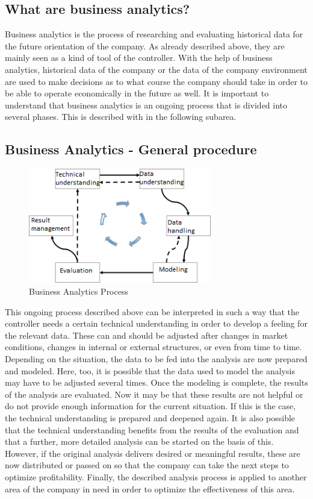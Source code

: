 \documentclass[12pt,twocolumn,twoside]{conference}   %
\begin{document}
\subsection{What are business analytics?}
Business analytics is the process of researching and evaluating historical data for the future orientation of the company.  As already described above, they are mainly seen as a kind of tool of the controller. With the help of business analytics, historical data of the company or the data of the company environment are used to make decisions as to what course the company should take in order to be able to operate economically in the future as well. It is important to understand that business analytics is an ongoing process that is divided into several phases. This is described with in the following subarea.


\subsection{Business Analytics - General procedure}

\begin{figure}[H]
\centering
\includegraphics[width=8cm]{Abbildungen/Business_Analytics_Process.png}
\caption{Business Analytics Process}\label{visina8}
\end{figure}

This ongoing process described above can be interpreted in such a way that the controller needs a certain technical understanding in order to develop a feeling for the relevant data. These can and should be adjusted after changes in market conditions, changes in internal or external structures, or even from time to time. Depending on the situation, the data to be fed into the analysis are now prepared and modeled. Here, too, it is possible that the data used to model the analysis may have to be adjusted several times. Once the modeling is complete, the results of the analysis are evaluated. Now it may be that these results are not helpful or do not provide enough information for the current situation. If this is the case, the technical understanding is prepared and deepened again. It is also possible that the technical understanding benefits from the results of the evaluation and that a further, more detailed analysis can be started on the basis of this. However, if the original analysis delivers desired or meaningful results, these are now distributed or passed on so that the company can take the next steps to optimize profitability. Finally, the described analysis process is applied to another area of the company in need in order to optimize the effectiveness of this area.
\end{document}
